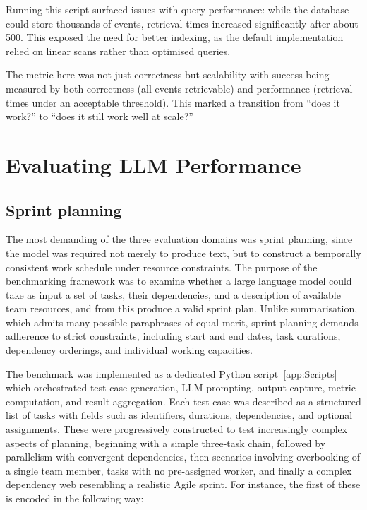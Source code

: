 \documentclass{report}
\begin{document}
Running this script surfaced issues with query performance: while the database could store thousands of events, retrieval times increased significantly after about 500.
This exposed the need for better indexing, as the default implementation relied on linear scans rather than optimised queries.

The metric here was not just correctness but scalability with success being measured by both correctness (all events retrievable) and performance (retrieval times under an acceptable threshold). 
This marked a transition from “does it work?” to “does it still work well at scale?”

\section{Evaluating LLM Performance}
\subsection{Sprint planning}

The most demanding of the three evaluation domains was sprint planning, since the model was required not merely to produce text, but to construct a temporally consistent work schedule under resource constraints. 
The purpose of the benchmarking framework was to examine whether a large language model could take as input a set of tasks, their dependencies, and a description of available team resources, and from this produce a valid sprint plan. 
Unlike summarisation, which admits many possible paraphrases of equal merit, sprint planning demands adherence to strict constraints, including start and end dates, task durations, dependency orderings, and individual working capacities.

The benchmark was implemented as a dedicated Python script~\ref{app:Scripts} which orchestrated test case generation, LLM prompting, output capture, metric computation, and result aggregation. 
Each test case was described as a structured list of tasks with fields such as identifiers, durations, dependencies, and optional assignments. 
These were progressively constructed to test increasingly complex aspects of planning, beginning with a simple three-task chain, followed by parallelism with convergent dependencies, then scenarios involving overbooking of a single team member, tasks with no pre-assigned worker, and finally a complex dependency web resembling a realistic Agile sprint. 
For instance, the first of these is encoded in the following way:
\end{document}
